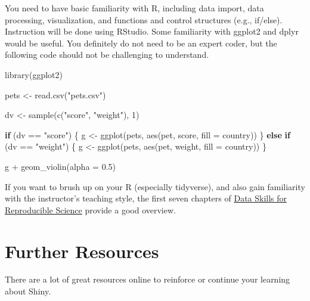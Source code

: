 \documentclass[
]{book}
\newenvironment{Shaded}{\begin{snugshade}}{\end{snugshade}}
\newcommand{\AttributeTok}[1]{\textcolor[rgb]{0.77,0.63,0.00}{#1}}
\newcommand{\ControlFlowTok}[1]{\textcolor[rgb]{0.13,0.29,0.53}{\textbf{#1}}}
\newcommand{\DecValTok}[1]{\textcolor[rgb]{0.00,0.00,0.81}{#1}}
\newcommand{\FloatTok}[1]{\textcolor[rgb]{0.00,0.00,0.81}{#1}}
\newcommand{\FunctionTok}[1]{\textcolor[rgb]{0.00,0.00,0.00}{#1}}
\newcommand{\NormalTok}[1]{#1}
\newcommand{\OtherTok}[1]{\textcolor[rgb]{0.56,0.35,0.01}{#1}}
\newcommand{\SpecialCharTok}[1]{\textcolor[rgb]{0.00,0.00,0.00}{#1}}
\newcommand{\StringTok}[1]{\textcolor[rgb]{0.31,0.60,0.02}{#1}}
\begin{document}
You need to have basic familiarity with R, including data import, data processing, visualization, and functions and control structures (e.g., if/else). Instruction will be done using RStudio. Some familiarity with ggplot2 and dplyr would be useful. You definitely do not need to be an expert coder, but the following code should not be challenging to understand.

\begin{Shaded}
\begin{Highlighting}[]
\FunctionTok{library}\NormalTok{(ggplot2)}

\NormalTok{pets }\OtherTok{\textless{}{-}} \FunctionTok{read.csv}\NormalTok{(}\StringTok{"pets.csv"}\NormalTok{)}

\NormalTok{dv }\OtherTok{\textless{}{-}} \FunctionTok{sample}\NormalTok{(}\FunctionTok{c}\NormalTok{(}\StringTok{"score"}\NormalTok{, }\StringTok{"weight"}\NormalTok{), }\DecValTok{1}\NormalTok{)}

\ControlFlowTok{if}\NormalTok{ (dv }\SpecialCharTok{==} \StringTok{"score"}\NormalTok{) \{}
\NormalTok{  g }\OtherTok{\textless{}{-}} \FunctionTok{ggplot}\NormalTok{(pets, }\FunctionTok{aes}\NormalTok{(pet, score, }\AttributeTok{fill =}\NormalTok{ country))}
\NormalTok{\} }\ControlFlowTok{else} \ControlFlowTok{if}\NormalTok{ (dv }\SpecialCharTok{==} \StringTok{"weight"}\NormalTok{) \{}
\NormalTok{  g }\OtherTok{\textless{}{-}} \FunctionTok{ggplot}\NormalTok{(pets, }\FunctionTok{aes}\NormalTok{(pet, weight, }\AttributeTok{fill =}\NormalTok{ country))}
\NormalTok{\}}

\NormalTok{g }\SpecialCharTok{+} \FunctionTok{geom\_violin}\NormalTok{(}\AttributeTok{alpha =} \FloatTok{0.5}\NormalTok{)}
\end{Highlighting}
\end{Shaded}

If you want to brush up on your R (especially tidyverse), and also gain familiarity with the instructor's teaching style, the first seven chapters of \href{https://psyteachr.github.io/msc-data-skills/}{Data Skills for Reproducible Science} provide a good overview.

\hypertarget{further-resources}{%
\section{Further Resources}\label{further-resources}}

There are a lot of great resources online to reinforce or continue your learning about Shiny.
\end{document}

